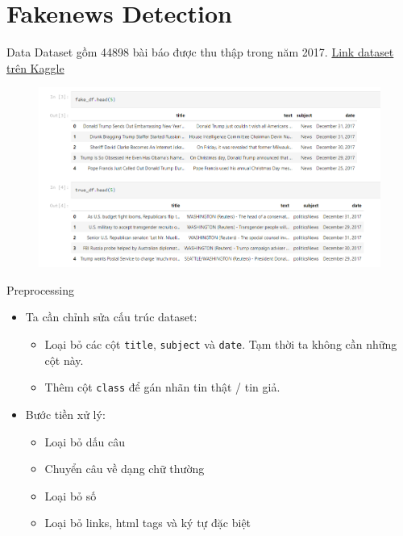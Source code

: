\documentclass[aspectratio=169,xcolor=dvipsnames]{beamer}
\begin{document}
\section{Fakenews Detection}

\begin{frame}{Data}
Dataset gồm 44898 bài báo được thu thập trong năm 2017. \href{https://www.kaggle.com/datasets/clmentbisaillon/fake-and-real-news-dataset}{Link dataset trên Kaggle}
\begin{figure}
\includegraphics[width=0.8\linewidth]{img/quick-glance-at-data.PNG}
\end{figure}
\end{frame}

\begin{frame}{Preprocessing}
\begin{itemize}
\item Ta cần chỉnh sửa cấu trúc dataset:
\begin{itemize}
\item Loại bỏ các cột \texttt{title}, \texttt{subject} và \texttt{date}. Tạm thời ta không cần những cột này.
\item Thêm cột \texttt{class} để gán nhãn tin thật / tin giả.
\end{itemize}
\item Bước tiền xử lý:
\begin{itemize}
\item Loại bỏ dấu câu
\item Chuyển câu về dạng chữ thường
\item Loại bỏ số
\item Loại bỏ links, html tags và ký tự đặc biệt
\end{itemize}
\end{itemize}
\end{frame}
\end{document}
